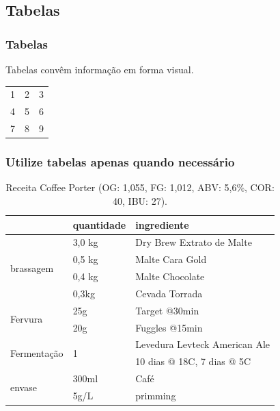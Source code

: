 \subsection{Tabelas}

\begin{frame}
\frametitle{Tabelas}
Tabelas convêm informação em forma visual.

\vspace{9ex}

\centering
\begin{tabular}{ l c r }
  1 & 2 & 3 \\
  4 & 5 & 6 \\
  7 & 8 & 9 \\
\end{tabular}
\end{frame}


\begin{frame}
\frametitle{Utilize tabelas apenas quando necessário}
\begin{table}[h]
\caption{\label{tab-receita}Receita Coffee Porter (OG: 1,055, FG: 1,012, ABV: 5,6\%, COR: 40, IBU: 27).}
\begin{tabular}{|l|l|l|}
\hline
	& quantidade & ingrediente \\
\hline
\multirow{4}{*}{brassagem} & 3,0 kg & Dry Brew Extrato de Malte \\
	& 0,5 kg & Malte Cara Gold \\
	& 0,4 kg & Malte Chocolate \\
	& 0,3kg & Cevada Torrada \\
\hline 
\multirow{2}{*}{Fervura} & 25g & Target @30min \\
	& 20g & Fuggles @15min \\
\hline
\multirow{2}{*}{Fermentação} & \multirow{2}{*}{1} & Levedura Levteck American Ale \\
	& & 10 dias @ 18C, 7 dias @ 5C \\
\hline
\multirow{2}{*}{envase} & 300ml & Café \\
	&  5g/L & primming \\
\hline
\end{tabular}
\end{table}
\end{frame}

